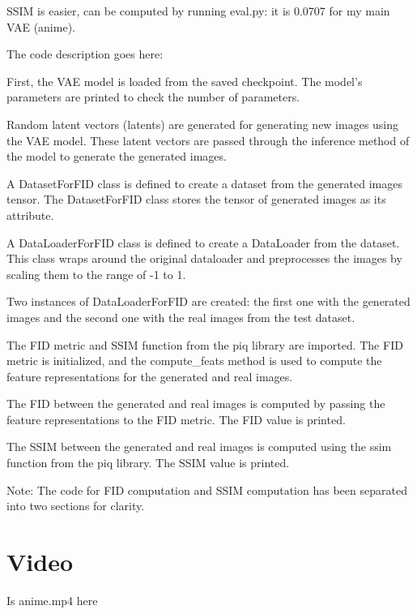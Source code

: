 \documentclass[a4paper]{article}
\begin{document}
SSIM is easier, can be computed by running eval.py: it is 0.0707 for my main VAE (anime).

The code description goes here:

First, the VAE model is loaded from the saved checkpoint. The model's parameters are printed to check the number of parameters.

Random latent vectors (latents) are generated for generating new images using the VAE model. These latent vectors are passed through the inference method of the model to generate the generated images.

A DatasetForFID class is defined to create a dataset from the generated images tensor. The DatasetForFID class stores the tensor of generated images as its attribute.

A DataLoaderForFID class is defined to create a DataLoader from the dataset. This class wraps around the original dataloader and preprocesses the images by scaling them to the range of -1 to 1.

Two instances of DataLoaderForFID are created: the first one with the generated images and the second one with the real images from the test dataset.

The FID metric and SSIM function from the piq library are imported. The FID metric is initialized, and the compute\_feats method is used to compute the feature representations for the generated and real images.

The FID between the generated and real images is computed by passing the feature representations to the FID metric. The FID value is printed.

The SSIM between the generated and real images is computed using the ssim function from the piq library. The SSIM value is printed.

Note: The code for FID computation and SSIM computation has been separated into two sections for clarity.


\section{Video}

Is anime.mp4 here
\end{document}
